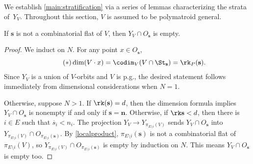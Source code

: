 \subsection{}\label{geomproofs}
We establish \cref{main:stratification} via a series of lemmas characterizing the strata of~$Y_V$.
Throughout this section, $V$ is assumed to be polymatroid general.
\begin{lemm}\label{avoidance}
  If $\mathbf s$ is not a combinatorial flat of $V$, then $Y_V \cap O_{\mathbf s}$ is empty.
\end{lemm}
\begin{proof}
  We induct on $N$.
  For any point $x \in O_{\mathbf s}$,
  \begin{equation}
    \label{dimformula}\tag{$*$}
    \dim(V \cdot x) = \codim_V(V \cap \St_{\mathbf s}) = \rk_P(\mathbf s).
  \end{equation}
  Since $Y_V$ is a union of $V$-orbits and $V$ is p.g., the desired statement follows immediately from dimensional considerations when $N=1$.

  Otherwise, suppose $N > 1$.
  If $\rk(\mathbf s) = d$, then the dimension formula implies $Y_V \cap O_{\mathbf s}$ is nonempty if and only if $\mathbf s = \mathbf n$.
  Otherwise, if $\rk \mathbf s < d$, then there is $i \in E$ such that  $\overline{s}_i < n_i$.
  The projection $Y_V \to Y_{\pi_{E \setminus i}(V)}$ sends $Y_V \cap O_{\mathbf s}$ into $Y_{\pi_{E \setminus i}(V)} \cap O_{\pi_{E \setminus i}(\mathbf s)}$.
  By \cref{localproduct}, $\pi_{E \setminus i}(\mathbf s)$ is not a combinatorial flat of $\pi_{E \setminus i}(V)$, so  $Y_{\pi_{E \setminus i}(V)} \cap O_{\pi_{E \setminus i}(\mathbf s)}$ is empty by induction on $N$. This means $Y_V \cap O_{\mathbf s}$ is empty too.
\end{proof}

